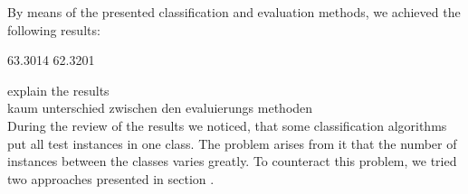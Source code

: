 By means of the presented classification and evaluation methods, we achieved the following results:
\begin{table}[h]
\label{table:resultsClassifiers}
\end{table}
63.3014 %
62.3201 %

explain the results\\
kaum unterschied zwischen den evaluierungs methoden\\



During the review of the results we noticed, that some classification algorithms put all test instances in one class. The problem arises from it that the number of instances between the classes varies greatly. To counteract this problem, we tried two approaches presented in section .


